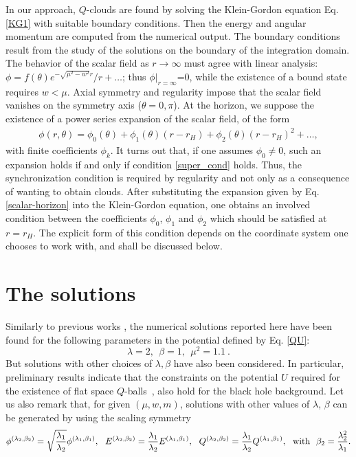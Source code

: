  
In our approach, $Q$-clouds are found by solving the Klein-Gordon equation Eq. \eqref{KG1}
with suitable boundary conditions.  
Then the energy and angular momentum are computed
from the numerical output.
The boundary conditions result from the study of the solutions
on the boundary of the integration domain. 
The behavior of the scalar field as $r\to \infty$ must agree
with linear analysis: $\phi=f(\theta)  {e^{-\sqrt{\mu^2-w^2}r}}/{r}+\dots$;
thus $\phi|_{r=\infty}$=0, while the existence of a bound state requires $w <\mu $.
Axial symmetry and
regularity impose that the scalar field vanishes on the symmetry axis ($\theta=0,\pi$).
At the horizon, we suppose the existence of a power series expansion of the scalar field,
of the form
\begin{eqnarray}
\label{scalar-horizon}
\phi(r,\theta)=\phi_{0}( \theta)+\phi_{1}( \theta)(r-r_H)+\phi_{2}( \theta)(r-r_H)^2+\dots,
\end{eqnarray}
with finite coefficients $\phi_{k}$.
%
It turns out that, if one assumes $\phi_{0}\neq 0$, such an expansion holds if and only if condition \eqref{super_cond} holds. 
Thus, the synchronization condition is required by regularity and not only as a consequence of wanting to obtain clouds.
After substituting the expansion given by Eq. \eqref{scalar-horizon} into the Klein-Gordon equation, one obtains an involved condition between the coefficients
$\phi_{0}$, $\phi_{1}$ and $\phi_{2}$ 
which should be satisfied at $r=r_H$.
The explicit form of this condition depends on the coordinate system one chooses to work with,
and shall be discussed below.

 

\section{The solutions}

 
Similarly to previous works 
\cite{Volkov:2002aj,Kleihaus:2005me}, 
the  numerical solutions reported here have been found for 
the following parameters in 
the potential
defined by Eq. \eqref{QU}:
%
\begin{equation}
\lambda = 2,~~\beta=1,~~\mu^2=1.1~.
\label{param}
\end{equation} 
But solutions with other choices of $\lambda,\beta$
have also been considered.
%
In particular, preliminary results indicate that the constraints
on the potential $U$  required
for the existence of flat space $Q$-balls~\cite{Coleman:1985ki}, 
also hold for the black hole background. 
%
Let us also remark that,
for given $(\mu,w,m)$,
solutions with other values of $\lambda$, $\beta$
can be generated by using the scaling symmetry
\begin{equation}
\phi^{(\lambda_2,\beta_2)}=\sqrt{\frac{\lambda_1}{\lambda_2}}\phi^{(\lambda_1,\beta_1)},~~
E^{(\lambda_2,\beta_2)}=\frac{\lambda_1}{\lambda_2}E^{(\lambda_1,\beta_1)},~~Q^{(\lambda_2,\beta_2)}=\frac{\lambda_1}{\lambda_2}Q^{(\lambda_1,\beta_1)},~~
{\rm with}~~\beta_2=\frac{\lambda_2^2}{\lambda_1}.
\label{symm}
\end{equation} 

